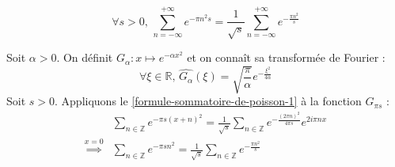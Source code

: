 	\begin{application}
		\[ \forall s > 0, \, \sum_{n=-\infty}^{+\infty} e^{-\pi n^2 s} = \frac{1}{\sqrt{s}} \sum_{n=-\infty}^{+\infty} e^{-\frac{\pi n^2}{s}} \]
	\end{application}

	\begin{demonstration}
		Soit $\alpha > 0$. On définit $G_\alpha : x \mapsto e^{-\alpha x^2}$ et on connaît sa transformée de Fourier :
		\[ \forall \xi \in \mathbb{R}, \, \widehat{G_\alpha}(\xi) = \sqrt{\frac{\pi}{\alpha}} e^{-\frac{\xi^2}{4 \alpha}} \]
		Soit $s > 0$. Appliquons le \cref{formule-sommatoire-de-poisson-1} à la fonction $G_{\pi s}$ :
		\begin{align*}
			& \sum_{n \in \mathbb{Z}} e^{-\pi s (x + n)^2} = \frac{1}{\sqrt{s}} \sum_{n \in \mathbb{Z}} e^{-\frac{(2 \pi n)^2}{4 \pi s}} e^{2 i \pi n x} \\
			\overset{x = 0}{\implies} & \sum_{n \in \mathbb{Z}} e^{-\pi s n^2} = \frac{1}{\sqrt{s}} \sum_{n \in \mathbb{Z}} e^{-\frac{\pi n^2}{s}}
		\end{align*}
	\end{demonstration}

